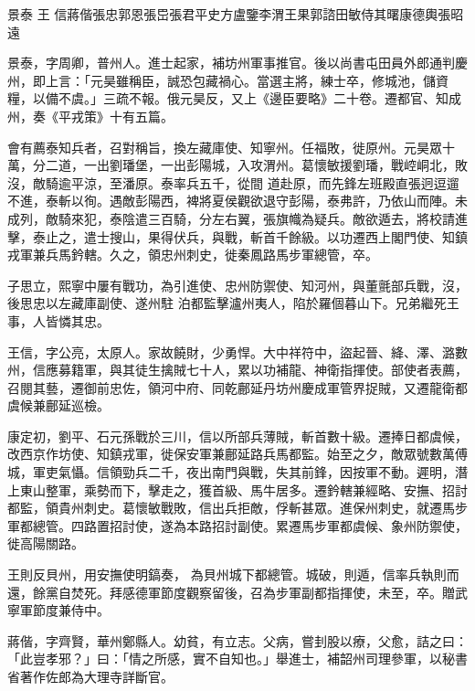 
\begin{pinyinscope}

 景泰
 王
 信蔣偕張忠郭恩張岊張君平史方盧鑒李渭王果郭諮田敏侍其曙康德輿張昭遠



 景泰，字周卿，普州人。進士起家，補坊州軍事推官。後以尚書屯田員外郎通判慶州，即上言：「元昊雖稱臣，誠恐包藏禍心。當選主將，練士卒，修城池，儲資糧，以備不虞。」三疏不報。俄元昊反，又上《邊臣要略》二十卷。遷都官、知成州，奏《平戎策》十有五篇。



 會有薦泰知兵者，召對稱旨，換左藏庫使、知寧州。任福敗，徙原州。元昊眾十萬，分二道，一出劉璠堡，一出彭陽城，入攻渭州。葛懷敏援劉璠，戰崆峒北，敗沒，敵騎逾平涼，至潘原。泰率兵五千，從間
 道赴原，而先鋒左班殿直張迥逗遛不進，泰斬以徇。遇敵彭陽西，裨將夏侯觀欲退守彭陽，泰弗許，乃依山而陣。未成列，敵騎來犯，泰陰遣三百騎，分左右翼，張旗幟為疑兵。敵欲遁去，將校請進擊，泰止之，遣士搜山，果得伏兵，與戰，斬首千餘級。以功遷西上閣門使、知鎮戎軍兼兵馬鈐轄。久之，領忠州刺史，徙秦鳳路馬步軍總管，卒。



 子思立，熙寧中屢有戰功，為引進使、忠州防禦使、知河州，與董氈部兵戰，沒，後思忠以左藏庫副使、遂州駐
 泊都監擊瀘州夷人，陷於羅個暮山下。兄弟繼死王事，人皆憐其忠。



 王信，字公亮，太原人。家故饒財，少勇悍。大中祥符中，盜起晉、絳、澤、潞數州，信應募籍軍，與其徒生擒賊七十人，累以功補龍、神衛指揮使。部使者表薦，召閱其藝，遷御前忠佐，領河中府、同乾鄜延丹坊州慶成軍管界捉賊，又遷龍衛都虞候兼鄜延巡檢。



 康定初，劉平、石元孫戰於三川，信以所部兵薄賊，斬首數十級。遷捧日都虞候，
 改西京作坊使、知鎮戎軍，徙保安軍兼鄜延路兵馬都監。始至之夕，敵眾號數萬傅城，軍吏氣懾。信領勁兵二千，夜出南門與戰，失其前鋒，因按軍不動。遲明，潛上東山整軍，乘勢而下，擊走之，獲首級、馬牛居多。遷鈐轄兼經略、安撫、招討都監，領貴州刺史。葛懷敏戰敗，信出兵拒敵，俘斬甚眾。進保州刺史，就遷馬步軍都總管。四路置招討使，遂為本路招討副使。累遷馬步軍都虞候、象州防禦使，徙高陽關路。



 王則反貝州，用安撫使明鎬奏，
 為貝州城下都總管。城破，則遁，信率兵執則而還，餘黨自焚死。拜感德軍節度觀察留後，召為步軍副都指揮使，未至，卒。贈武寧軍節度兼侍中。



 蔣偕，字齊賢，華州鄭縣人。幼貧，有立志。父病，嘗刲股以療，父愈，詰之曰：「此豈孝邪？」曰：「情之所感，實不自知也。」舉進士，補韶州司理參軍，以秘書省著作佐郎為大理寺詳斷官。




\end{pinyinscope}
